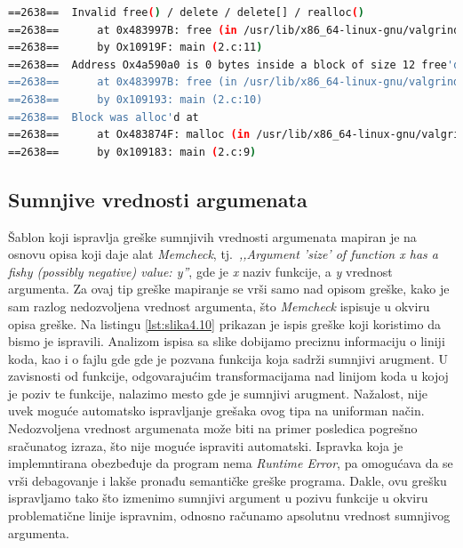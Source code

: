 \documentclass[12pt,oneside]{memoir}
\theoremstyle{plain}
\theoremstyle{definition}
\begin{document}

\begin{lstlisting}[style=terminal,caption={Ispis greške nevalidnog oslobađanja memorije}, label={lst:slika4.9},language={bash}]   
==2638==  Invalid free() / delete / delete[] / realloc()
==2638==      at 0x483997B: free (in /usr/lib/x86_64-linux-gnu/valgrind/vgpreload_memcheck-amd64-linux.so) 
==2638==      by Ox10919F: main (2.c:11)
==2638==  Address Ox4a590a0 is 0 bytes inside a block of size 12 free'd
==2638==      at 0x483997B: free (in /usr/lib/x86_64-linux-gnu/valgrind/vgpreload_memcheck-amd64-linux.so) 
==2638==      by 0x109193: main (2.c:10)
==2638==  Block was alloc'd at
==2638==      at Ox483874F: malloc (in /usr/lib/x86_64-linux-gnu/valgrind/vgpreload_memcheck-amd64-linux.so) 
==2638==      by 0x109183: main (2.c:9)
\end{lstlisting}

\subsection{Sumnjive vrednosti argumenata}
Šablon koji ispravlja greške sumnjivih vrednosti argumenata mapiran je na osnovu opisa koji daje alat \textit{Memcheck}, tj.~\textit{,,Argument 'size' of function x has a fishy (possibly negative) value: y''}, gde je \textit{x} naziv funkcije, a \textit{y} vrednost argumenta. Za ovaj tip greške mapiranje se vrši samo nad opisom greške, kako je sam razlog nedozvoljena vrednost argumenta, što \textit{Memcheck} ispisuje u okviru opisa greške. Na listingu \ref{lst:slika4.10} prikazan je ispis greške koji koristimo da bismo je ispravili. Analizom ispisa sa slike dobijamo preciznu informaciju o liniji koda, kao i o fajlu gde gde je pozvana funkcija koja sadrži sumnjivi arugment. U zavisnosti od funkcije, odgovarajućim transformacijama nad linijom koda u kojoj je poziv te funkcije, nalazimo mesto gde je sumnjivi arugment. Nažalost, nije uvek moguće automatsko ispravljanje grešaka ovog tipa na uniforman način. Nedozvoljena vrednost argumenata može biti na primer posledica pogrešno sračunatog izraza, što nije moguće ispraviti automatski. Ispravka koja je implemntirana obezbeđuje da program nema \textit{Runtime Error}, pa omogućava da se vrši debagovanje i lakše pronađu semantičke greške programa. Dakle, ovu grešku ispravljamo tako što izmenimo sumnjivi argument u pozivu funkcije u okviru problematične linije ispravnim, odnosno računamo apsolutnu vrednost sumnjivog argumenta. 
\end{document}
